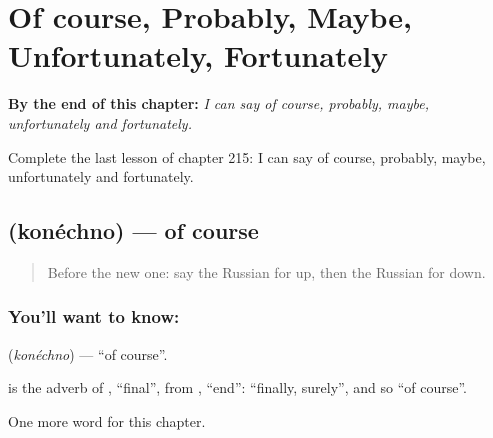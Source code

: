 
\chapter{Of course, Probably, Maybe, Unfortunately, Fortunately}
\label{ch:ru-of-course-probably-maybe-unfortunately-fortunately}

\begin{chapteropening}
\textbf{By the end of this chapter:} \emph{I can say of course, probably, maybe, unfortunately and fortunately.}

Complete the last lesson of chapter 215: I can say of course, probably, maybe, unfortunately and fortunately.
\end{chapteropening}

\section[\texorpdfstring{\ru{конечно} (konéchno)}{конечно (konéchno)}]{ (konéchno) — of course}

\label{lesson:RU-C215-konechno}



\begin{quote}
Before the new one: say the Russian for up, then the Russian for down.
\end{quote}

\subsection*{You'll want to know: }
\textbf{} (\emph{konéchno}) — \textquotedblleft{}of course\textquotedblright{}.

\begin{cousinweb}
\textbf{} is the adverb of \emph{}, \textquotedblleft{}final\textquotedblright{}, from \emph{}, \textquotedblleft{}end\textquotedblright{}: \textquotedblleft{}finally, surely\textquotedblright{}, and so \textquotedblleft{}of course\textquotedblright{}.
\end{cousinweb}

\begin{grammarlens}[title={What you've built}]
One more word for this chapter.
\end{grammarlens}

